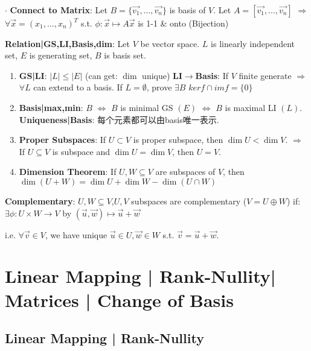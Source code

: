 \documentclass[9pt]{article}
\begin{document}
$\cdot$ \textbf{Connect to Matrix}: {\footnotesize Let $B=\{\vec{v_1},...,\vec{v_n}\}$ is basis of $V$. Let $A=[\vec{v_1},...,\vec{v_n}]$ $\Rightarrow$ $\forall\vec{x}=(x_1,...,x_n)^T$ s.t. $\phi:\vec{x}\mapsto A\vec{x}$ is 1-1 \& onto (Bijection)}

\textbf{Relation|GS,LI,Basis,dim}: {\small Let $V$ be vector space. $L$ is linearly independent set, $E$ is generating set, $B$ is basis set.}

\begin{enumerate}[itemsep=-2pt, topsep=-2pt]
    \item \textbf{GS|LI}: $|L|\leq|E|$ {\scriptsize (can get: $\dim$ unique)} \quad \textbf{LI$\to$Basis}: If $V$ finite generate $\Rightarrow$ $\forall L$ can extend to a basis. {\scriptsize If $L=\emptyset$, prove $\exists B$} \quad \quad $ker f\cap im f=\{0\}$
    \item \textbf{Basis|max,min}: $B$ $\Leftrightarrow$ $B$ is minimal GS $(E)$ $\Leftrightarrow$ $B$ is maximal LI $(L)$. \quad \textbf{Uniqueness|Basis}: {\small 每个元素都可以由basis唯一表示.}
    \item \textbf{Proper Subspaces}: {\small If $U\subset V$ is proper subspace, then $\dim U<\dim V$. \quad $\Rightarrow$ \quad If $U\subseteq V$ is subspace and $\dim U=\dim V$, then $U=V$.}
    \item \textbf{Dimension Theorem}: If $U,W\subseteq V$ are subspaces of $V$, then $\dim(U+W)=\dim U+\dim W-\dim(U\cap W)$
\end{enumerate}

\textbf{Complementary}: $U,W\subseteq V$,$U,V$ subspaces are complementary ($V=U\oplus W$) if: \quad $\exists\phi:U\times W\to V$ by $(\vec{u},\vec{w})\mapsto\vec{u}+\vec{w}$

\quad \quad \quad \quad \quad \quad \quad \quad i.e. $\forall\vec{v}\in V$, we have unique $\vec{u}\in U,\vec{w}\in W$ s.t. $\vec{v}=\vec{u}+\vec{w}$. 


\section{Linear Mapping | Rank-Nullity| Matrices | Change of Basis }

\subsection{Linear Mapping | Rank-Nullity} %
\end{document}
